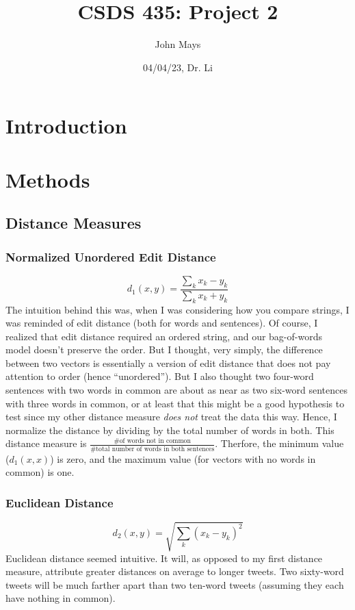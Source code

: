 \documentclass[fleqn]{article}
\title{\textbf{CSDS 435: Project 2}}
\author{John Mays}
\date{04/04/23, Dr. Li}
\begin{document}
\maketitle

\section{Introduction}
\section{Methods}
\subsection{Distance Measures}
\subsubsection{Normalized Unordered Edit Distance}
$$d_{1}(x,y)=\frac{\sum_{k}x_k-y_k}{\sum_{k}x_k+y_k}$$
The intuition behind this was, when I was considering how you compare strings, I was reminded of edit distance (both for words and sentences).  Of course, I realized that edit distance required an ordered string, and our bag-of-words model doesn't preserve the order.  But I thought, very simply, the difference between two vectors is essentially a version of edit distance that does not pay attention to order (hence ``unordered'').  But I also thought two four-word sentences with two words in common are about as near as two six-word sentences with three words in common, or at least that this might be a good hypothesis to test since my other distance measure \textit{does not} treat the data this way.  Hence, I normalize the distance by dividing by the total number of words in both.  This distance measure is $\frac{\text{\# of words not in common}}{\text{\# total number of words in both sentences}}$.  Therfore, the minimum value ($d_{1}(x,x)$) is zero, and the maximum value (for vectors with no words in common) is one.

\subsubsection{Euclidean Distance}
$$d_{2}(x,y)=\sqrt{\sum_{k}(x_k-y_k)^{2}}$$
Euclidean distance seemed intuitive.  It will, as opposed to my first distance measure, attribute greater distances on average to longer tweets.  Two sixty-word tweets will be much farther apart than two ten-word tweets (assuming they each have nothing in common).
\end{document}
